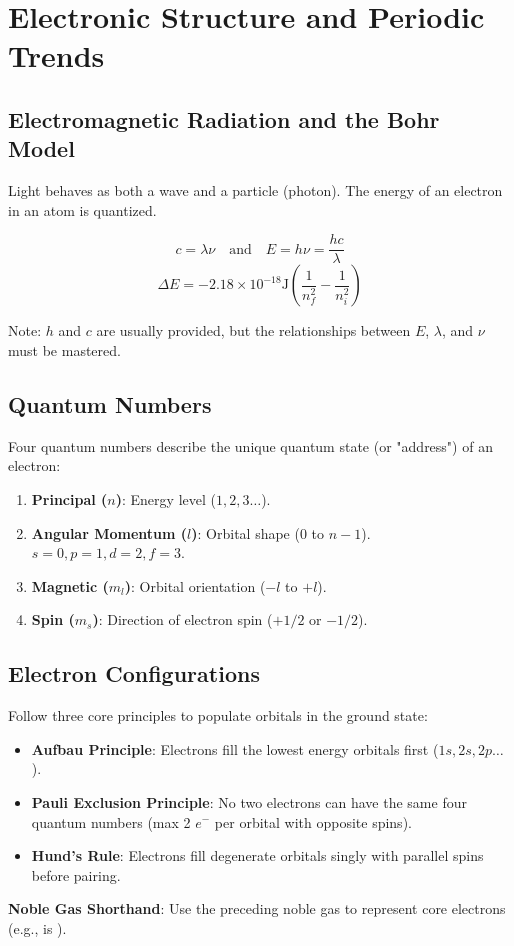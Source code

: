 \documentclass[11pt]{article}
\begin{document}
\newpage

\section{Electronic Structure and Periodic Trends}

\subsection{Electromagnetic Radiation and the Bohr Model}
Light behaves as both a wave and a particle (photon). The energy of an electron in an atom is quantized.
\begin{tcolorbox}[memorize, title=Light and Photon Energy *]
    \[ c = \lambda \nu \quad \text{and} \quad E = h\nu = \frac{hc}{\lambda} \]
    \[ \Delta E = -2.18 \times 10^{-18} \si{\joule} \left( \frac{1}{n_f^2} - \frac{1}{n_i^2} \right) \]
\end{tcolorbox}
Note: $h$ and $c$ are usually provided, but the relationships between $E$, $\lambda$, and $\nu$ must be mastered.

\subsection{Quantum Numbers}
Four quantum numbers describe the unique quantum state (or "address") of an electron:
\begin{enumerate}
    \item \textbf{Principal ($n$)}: Energy level ($1, 2, 3 \dots$).
    \item \textbf{Angular Momentum ($l$)}: Orbital shape ($0$ to $n-1$). $s=0, p=1, d=2, f=3$.
    \item \textbf{Magnetic ($m_l$)}: Orbital orientation ($-l$ to $+l$).
    \item \textbf{Spin ($m_s$)}: Direction of electron spin ($+1/2$ or $-1/2$).
\end{enumerate}

\subsection{Electron Configurations}
Follow three core principles to populate orbitals in the ground state:
\begin{itemize}
    \item \textbf{Aufbau Principle}: Electrons fill the lowest energy orbitals first ($1s, 2s, 2p \dots$).
    \item \textbf{Pauli Exclusion Principle}: No two electrons can have the same four quantum numbers (max 2 $e^-$ per orbital with opposite spins).
    \item \textbf{Hund's Rule}: Electrons fill degenerate orbitals singly with parallel spins before pairing.
\end{itemize}
\textbf{Noble Gas Shorthand}: Use the preceding noble gas to represent core electrons (e.g.,  is ).
\end{document}
